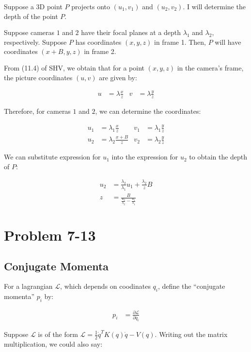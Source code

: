 \documentclass{article}
\begin{document}
Suppose a 3D point $P$ projects onto $(u_1, v_1)$ and $(u_2, v_2)$.
I will determine the depth of the point $P$.

Suppose cameras $1$ and $2$ have their focal planes at a depth $\lambda_1$
	and $\lambda_2$, respectively.
Suppose $P$ has coordinates $(x, y, z)$ in frame 1.
Then, $P$ will have coordinates $(x + B, y, z)$ in frame 2.

From (11.4) of SHV, we obtain that for a point $(x,y,z)$  in the camera's frame,
	the picture coordinates $(u,v)$ are given by:

\begin{align}
	u & = \lambda \frac x z & v & = \lambda \frac y z 
\end{align}

Therefore, for cameras $1$ and $2$, we can determine the coordinates:

\begin{align}
	u_1 & = \lambda_1 \frac x z 
	&
	v_1 & = \lambda_1 \frac y z
	\\
	u_2 & = \lambda_2 \frac {x + B} z 
	&
	v_2 & = \lambda_2 \frac y z
\end{align}	

We can substitute expression for $u_1$ into the expression for $u_2$ to obtain
	the depth of $P$:

\begin{align}
	u_2 & = \frac {\lambda_2}{\lambda_1} u_1 + \frac{\lambda_2}{z} B \nonumber\\
	z & = \frac B {\frac {u_2}{\lambda_2} - \frac{u_1}{\lambda_1}} \label{eq-depth}
\end{align}

\section{Problem 7-13}

\subsection{Conjugate Momenta}

For a lagrangian $\mathcal{L}$, which depends on coodinates $q_i$, define the
	``conjugate momenta'' $p_i$ by:

\begin{align}
	p_i & = \frac {\partial \mathcal{L}}{\partial \dot{q_i}}
		\label{eq-def-of-p}
\end{align}

Suppose $\mathcal{L}$ is of the form 
	$\mathcal{L} = \frac12 \dot{q}^T K(q) \dot{q} - V(q)$.
Writing out the matrix multiplication, we could also say:
\end{document}
